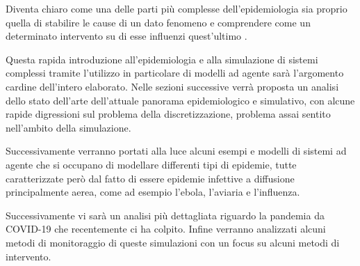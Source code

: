 Diventa chiaro come una delle parti più complesse 
dell’epidemiologia sia proprio quella di stabilire le cause di 
un dato fenomeno e comprendere come un determinato intervento 
su di esse influenzi quest’ultimo \cite{Galea2009-lj} 
\cite{Parascandola2001-kw}. 

Questa rapida introduzione all’epidemiologia e alla simulazione 
di sistemi complessi tramite l’utilizzo in particolare di 
modelli ad agente sarà l’argomento cardine dell’intero 
elaborato. Nelle sezioni successive verrà proposta un analisi 
dello stato dell’arte dell’attuale 
panorama epidemiologico e simulativo, con alcune rapide 
digressioni sul problema della discretizzazione, problema 
assai sentito nell’ambito della simulazione. 

Successivamente verranno portati alla luce alcuni esempi e 
modelli di sistemi ad agente che si occupano di modellare 
differenti tipi di epidemie, tutte caratterizzate però dal 
fatto di essere epidemie infettive a diffusione principalmente 
aerea, come ad esempio l’ebola, l’aviaria e l’influenza. 

Successivamente vi sarà un analisi più dettagliata riguardo la 
pandemia da COVID-19 che recentemente ci ha colpito. 
Infine verranno analizzati alcuni metodi di monitoraggio di 
queste simulazioni con un focus su alcuni metodi di intervento.